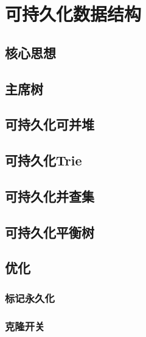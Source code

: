 \section{可持久化数据结构}
\subsection{核心思想}
\subsection{主席树}
\subsection{可持久化可并堆}
\subsection{可持久化Trie}
\subsection{可持久化并查集}
\subsection{可持久化平衡树}
\subsection{优化}
\subsubsection{标记永久化}
\subsubsection{克隆开关}